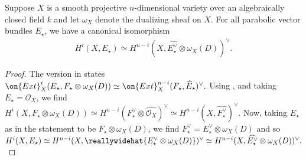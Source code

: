 \begin{proposition}
\notready
	\label{proposition:serre-duality}
	Suppose $X$ is a smooth projective $n$-dimensional variety over an
	algebraically closed field $k$ and let $\omega_X$ denote the dualizing
	sheaf on $X$. For all parabolic vector bundles $E_\star$, we have a canonical isomorphism
\begin{align*}
	H^i(X, E_\star) \simeq H^{n-i}(X, \widehat{E_\star^\vee} \otimes
	\omega_X(D))^\vee.
\end{align*}
\end{proposition}
\begin{proof}
	The version in \cite[Proposition
	3.7]{yokogawa:infinitesimal-deformation} states
	$\on{Ext}^i_X(E_\star, F_\star \otimes \omega_X(D)) \simeq
	\on{Ext}^{n-i}_X(F_\star, \widehat{E}_\star)^\vee.$
	Using \cite[Lemma 3.6]{yokogawa:infinitesimal-deformation}, and taking
	$E_\star = \mathscr O_X$, we find
	$H^i(X, F_\star \otimes \omega_X(D)) \simeq H^{n-i}( F_\star^\vee
		\otimes
	\widehat{\mathscr O_X})^\vee \simeq H^{n-i}(X, \widehat{F_\star^\vee})^\vee$.
	Now, taking $E_\star$ as in the statement to be
	$F_\star \otimes \omega_X(D)$, we find $F_\star^\vee = E_\star^\vee
	\otimes \omega_X(D)$ and so
$H^i(X, E_\star) \simeq H^{n-i}(X, \reallywidehat{E_\star^\vee \otimes
\omega_X(D)})^\vee \simeq
H^{n-i}(X, \widehat{E_\star^\vee} \otimes
\omega_X(D))^\vee.$
\end{proof}
